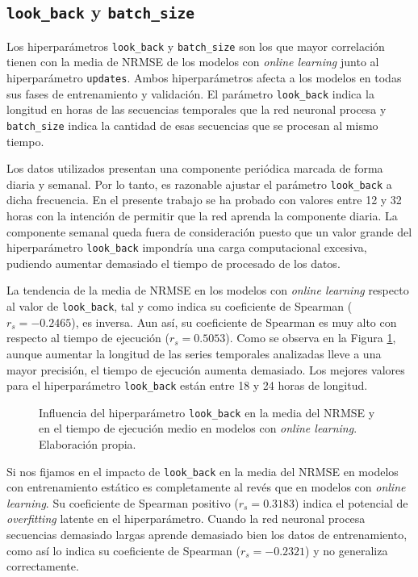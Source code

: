 \subsection{\texttt{look\_back} y \texttt{batch\_size}}
Los hiperparámetros \texttt{look\_back} y \texttt{batch\_size} son los que mayor correlación tienen con la media de NRMSE de los modelos con \textit{online learning} junto al hiperparámetro \texttt{updates}. Ambos hiperparámetros afecta a los modelos en todas sus fases de entrenamiento y validación. El parámetro \texttt{look\_back} indica la longitud en horas de las secuencias temporales que la red neuronal procesa y \texttt{batch\_size} indica la cantidad de esas secuencias que se procesan al mismo tiempo.

Los datos utilizados presentan una componente periódica marcada de forma diaria y semanal. Por lo tanto, es razonable ajustar el parámetro \texttt{look\_back} a dicha frecuencia. En el presente trabajo se ha probado con valores entre 12 y 32 horas con la intención de permitir que la red aprenda la componente diaria. La componente semanal queda fuera de consideración puesto que un valor grande del hiperparámetro \texttt{look\_back} impondría una carga computacional excesiva, pudiendo aumentar demasiado el tiempo de procesado de los datos.

La tendencia de la media de NRMSE en los modelos con \textit{online learning} respecto al valor de \texttt{look\_back}, tal y como indica su coeficiente de Spearman ($r_s=-0.2465$), es inversa. Aun así, su coeficiente de Spearman es muy alto con respecto al tiempo de ejecución ($r_s=0.5053$). Como se observa en la Figura \ref{fig:lookback_nmrse_time}, aunque aumentar la longitud de las series temporales analizadas lleve a una mayor precisión, el tiempo de ejecución aumenta demasiado. Los mejores valores para el hiperparámetro \texttt{look\_back} están entre 18 y 24 horas de longitud.

\begin{figure}[h!]
	\centering
	
	\caption{Influencia del hiperparámetro \texttt{look\_back} en la media del NRMSE y en el tiempo de ejecución medio en modelos con \textit{online learning}. Elaboración propia.}
	\label{fig:lookback_nmrse_time}
\end{figure}
\FloatBarrier

Si nos fijamos en el impacto de \texttt{look\_back} en la media del NRMSE en modelos con entrenamiento estático es completamente al revés que en modelos con \textit{online learning}. Su coeficiente de Spearman positivo ($r_s=0.3183$) indica el potencial de \textit{overfitting} latente en el hiperparámetro. Cuando la red neuronal procesa secuencias demasiado largas aprende demasiado bien los datos de entrenamiento, como así lo indica su coeficiente de Spearman ($r_s=-0.2321$) y no generaliza correctamente.



